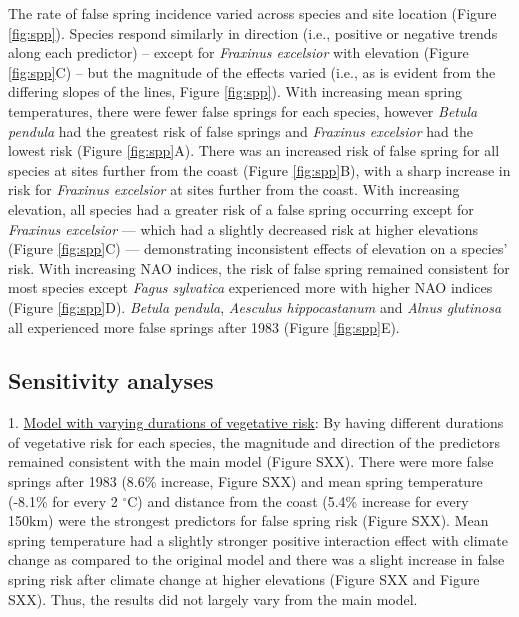 \documentclass{article}\usepackage[]{graphicx}\usepackage[]{color}
\begin{document}
The rate of false spring incidence varied across species and site location (Figure \ref{fig:spp}). Species respond similarly in direction (i.e., positive or negative trends along each predictor) -- except for \textit{Fraxinus excelsior} with elevation (Figure \ref{fig:spp}C) -- but the magnitude of the effects varied (i.e., as is evident from the differing slopes of the lines, Figure \ref{fig:spp}). With increasing mean spring temperatures, there were fewer false springs for each species, however \textit{Betula pendula} had the greatest risk of false springs and \textit{Fraxinus excelsior} had the lowest risk (Figure \ref{fig:spp}A). There was an increased risk of false spring for all species at sites further from the coast (Figure \ref{fig:spp}B), with a sharp increase in risk for \textit{Fraxinus excelsior} at sites further from the coast. With increasing elevation, all species had a greater risk of a false spring occurring except for \textit{Fraxinus excelsior} --- which had a slightly decreased risk at higher elevations (Figure \ref{fig:spp}C) --- demonstrating inconsistent effects of elevation on a species' risk.  With increasing NAO indices, the risk of false spring remained consistent for most species except \textit{Fagus sylvatica} experienced more with higher NAO indices (Figure \ref{fig:spp}D). \textit{Betula pendula}, \textit{Aesculus hippocastanum} and \textit{Alnus glutinosa} all experienced more false springs after 1983 (Figure \ref{fig:spp}E). %

\subsection*{Sensitivity analyses}
1. \underline{Model with varying durations of vegetative risk}: By having different durations of vegetative risk for each species, the magnitude and direction of the predictors remained consistent with the main model (Figure SXX). There were more false springs after 1983 (8.6\% increase, Figure SXX) and mean spring temperature (-8.1\% for every 2 $^\circ$C) and distance from the coast (5.4\% increase for every 150km) were the strongest predictors for false spring risk (Figure SXX). Mean spring temperature had a slightly stronger positive interaction effect with climate change as compared to the original model and there was a slight increase in false spring risk after climate change at higher elevations (Figure SXX and Figure SXX). Thus, the results did not largely vary from the main model. 
\end{document}
